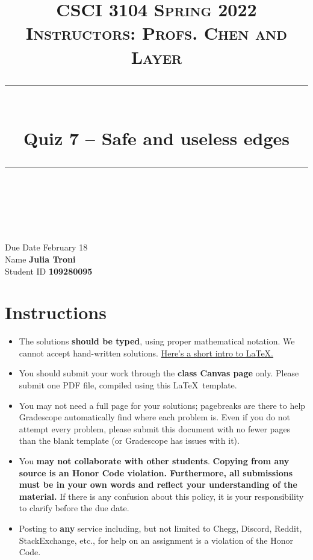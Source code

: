 \documentclass[11pt]{article}
\title{
\normalfont \normalsize 
\textsc{CSCI 3104 Spring 2022 \\ 
Instructors: Profs. Chen and Layer} \\
[10pt] 
\rule{\linewidth}{0.5pt} \\[6pt] 
\huge Quiz 7 -- Safe and useless edges \\
\rule{\linewidth}{2pt}  \\[10pt]
}
\date{}
\theoremstyle{definition}
\theoremstyle{definition}
\theoremstyle{definition}
\begin{document}

\maketitle


\noindent
Due Date \dotfill February 18 \\
Name \dotfill \textbf{Julia Troni} \\
Student ID \dotfill \textbf{109280095} \\

\tableofcontents

\section{Instructions}
 \begin{itemize}
	\item The solutions \textbf{should be typed}, using proper mathematical notation. We cannot accept hand-written solutions. \href{http://ece.uprm.edu/~caceros/latex/introduction.pdf}{Here's a short intro to \LaTeX.}
	\item You should submit your work through the \textbf{class Canvas page} only. Please submit one PDF file, compiled using this \LaTeX \ template.
	\item You may not need a full page for your solutions; pagebreaks are there to help Gradescope automatically find where each problem is. Even if you do not attempt every problem, please submit this document with no fewer pages than the blank template (or Gradescope has issues with it).

	\item You \textbf{may not collaborate with other students}. \textbf{Copying from any source is an Honor Code violation. Furthermore, all submissions must be in your own words and reflect your understanding of the material.} If there is any confusion about this policy, it is your responsibility to clarify before the due date. 

	\item Posting to \textbf{any} service including, but not limited to Chegg, Discord, Reddit, StackExchange, etc., for help on an assignment is a violation of the Honor Code.

\end{itemize}
\end{document}
